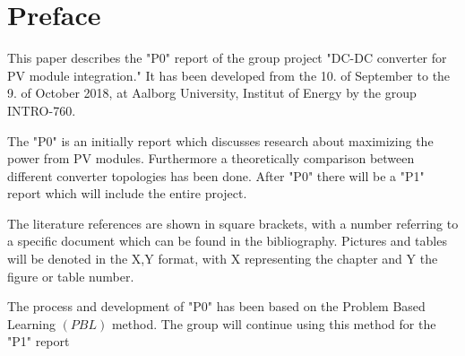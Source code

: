 \chapter*{Preface}

This paper describes the "P0" report of the group project "DC-DC converter for PV module integration." It has been developed from the 10. of September to the 9. of October 2018, at Aalborg University, Institut of Energy by the group INTRO-760.

The "P0" is an initially report which discusses research about maximizing the power from PV modules.
Furthermore a theoretically comparison between different converter topologies has been done. After "P0" there will be a "P1" report which will include the entire project.

The literature references are shown in square brackets, with a number referring to a specific document which can be found in the bibliography. Pictures and tables will be denoted in the X,Y format, with X representing the chapter and Y the figure or table number. 

The process and development of "P0" has been based on the Problem Based Learning $(PBL)$ method. The group will continue using this method for the "P1" report           